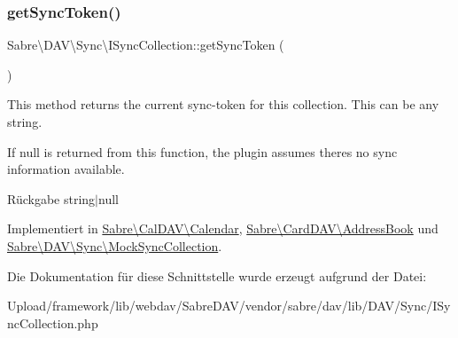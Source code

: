 \mbox{\label{interface_sabre_1_1_d_a_v_1_1_sync_1_1_i_sync_collection_ae8b002d4a88dc34170f9468b5009e08f}} 
\subsubsection{\texorpdfstring{get\+Sync\+Token()}{getSyncToken()}}
{\footnotesize\ttfamily Sabre\textbackslash{}\+D\+A\+V\textbackslash{}\+Sync\textbackslash{}\+I\+Sync\+Collection\+::get\+Sync\+Token (\begin{DoxyParamCaption}{ }\end{DoxyParamCaption})}

This method returns the current sync-\/token for this collection. This can be any string.

If null is returned from this function, the plugin assumes there\textquotesingle{}s no sync information available.

\begin{DoxyReturn}{Rückgabe}
string$\vert$null 
\end{DoxyReturn}


Implementiert in \mbox{\hyperlink{class_sabre_1_1_cal_d_a_v_1_1_calendar_a74fa64b6484a0cd7f3300d89a96d74d9}{Sabre\textbackslash{}\+Cal\+D\+A\+V\textbackslash{}\+Calendar}}, \mbox{\hyperlink{class_sabre_1_1_card_d_a_v_1_1_address_book_a64df90dc7a77af4028d9eb8ce6be0ffb}{Sabre\textbackslash{}\+Card\+D\+A\+V\textbackslash{}\+Address\+Book}} und \mbox{\hyperlink{class_sabre_1_1_d_a_v_1_1_sync_1_1_mock_sync_collection_a9fc3b8d7c6e94be4c34c9b2761494f9c}{Sabre\textbackslash{}\+D\+A\+V\textbackslash{}\+Sync\textbackslash{}\+Mock\+Sync\+Collection}}.



Die Dokumentation für diese Schnittstelle wurde erzeugt aufgrund der Datei\+:\begin{DoxyCompactItemize}
\item 
Upload/framework/lib/webdav/\+Sabre\+D\+A\+V/vendor/sabre/dav/lib/\+D\+A\+V/\+Sync/I\+Sync\+Collection.\+php\end{DoxyCompactItemize}
